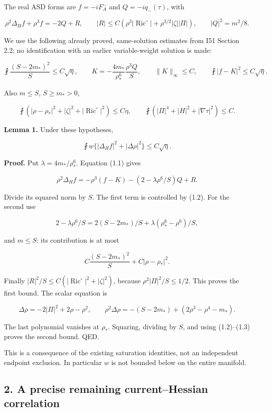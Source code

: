 \documentclass[
  11pt,
]{article}
\begin{document}
The real ASD forms are \(f=-iF_A^-\) and \(Q=-iq_-(\tau)\), with

\[
 \rho^2\Delta_Hf+\rho^3f=-2Q+R,\qquad
 |R|\le C(\rho^3|\operatorname{Ric}^{\circ}|
                       +\rho^{3/2}|\zeta||\Pi|),\qquad |Q|^2=m^2/8.
 \tag{1.1}
\]

We use the following already proved, same-solution estimates from I51
Section 2.2; no identification with an earlier variable-weight solution
is made:

\[
 \fint\frac{(S-2m_*)^2}{S}\le C\sqrt\eta,\qquad
 K=-\frac{4m_*}{\rho_*^6}\frac{\rho^3Q}{S},\qquad
 \|K\|_\infty\le C,\qquad \fint|f-K|^2\le C\sqrt\eta.
 \tag{1.2}
\]

Also \(m\le S\), \(S\ge m_*>0\),

\[
 \fint(|\rho-\rho_*|^2+|\zeta|^2+|\operatorname{Ric}^{\circ}|^2)
 \le C\eta,\qquad
 \fint(|\Pi|^4+|H|^2+|\nabla\tau|^2)\le C.
 \tag{1.3}
\]

\textbf{Lemma 1.} Under these hypotheses,

\[
 \boxed{\fint w\{ |\Delta_Hf|^2+|\Delta\rho|^2\}\le C\sqrt\eta.}
 \tag{1.4}
\]

\textbf{Proof.} Put \(\lambda=4m_*/\rho_*^6\). Equation (1.1) gives

\[
 \rho^2\Delta_Hf=-\rho^3(f-K)
                 -(2-\lambda\rho^6/S)Q+R.
\]

Divide its squared norm by \(S\). The first term is controlled by (1.2).
For the second use

\[
 2-\lambda\rho^6/S
 =2(S-2m_*)/S+\lambda(\rho_*^6-\rho^6)/S,
\]

and \(m\le S\): its contribution is at most

\[
 C\frac{(S-2m_*)^2}{S}+C|\rho-\rho_*|^2.
\]

Finally \(|R|^2/S\le C(|\operatorname{Ric}^{\circ}|^2+|\zeta|^2)\),
because \(\rho^2|\Pi|^2/S\le1/2\). This proves the first bound. The
scalar equation is

\[
 \Delta\rho=-2|\Pi|^2+2\rho-\rho^2,
 \qquad
 \rho^2\Delta\rho=-(S-2m_*)+(2\rho^3-\rho^4-m_*).
\]

The last polynomial vanishes at \(\rho_*\). Squaring, dividing by \(S\),
and using (1.2)--(1.3) proves the second bound. QED.

This is a consequence of the existing saturation identities, not an
independent endpoint exclusion. In particular \(w\) is not bounded below
on the entire manifold.

\hypertarget{a-precise-remaining-currenthessian-correlation}{%
\subsection{2. A precise remaining current--Hessian
correlation}\label{a-precise-remaining-currenthessian-correlation}}
\end{document}

